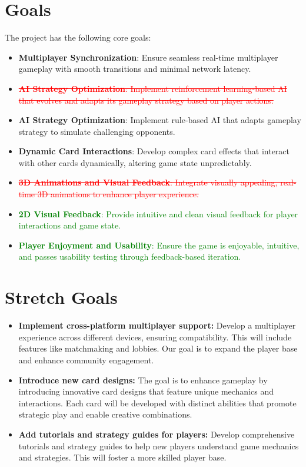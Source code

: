 \documentclass[12pt]{article}
\newcommand{\removed}[1]{\textcolor{red}{\sout{#1}}}
\newcommand{\added}[1]{\textcolor{green}{#1}}
\begin{document}
\section*{Goals}
The project has the following core goals:
\begin{itemize}
    \item \textbf{Multiplayer Synchronization}: Ensure seamless real-time multiplayer gameplay with smooth transitions and minimal network latency.
    \item{\removed { \textbf{AI Strategy Optimization}: Implement reinforcement learning-based AI that evolves and adapts its gameplay strategy based on player actions.}}
    \item \textbf{AI Strategy Optimization}: Implement rule-based AI that adapts gameplay strategy to simulate challenging opponents.
    \item \textbf{Dynamic Card Interactions}: Develop complex card effects that interact with other cards dynamically, altering game state unpredictably.
    \item{\removed { \textbf{3D Animations and Visual Feedback}: Integrate visually appealing, real-time 3D animations to enhance player experience.}}
    \item \added{\textbf{2D Visual Feedback}: Provide intuitive and clean visual feedback for player interactions and game state.}
    \item \added{\textbf{Player Enjoyment and Usability}: Ensure the game is enjoyable, intuitive, and passes usability testing through feedback-based iteration.}
\end{itemize}

\section*{Stretch Goals}
\begin{itemize}
    \item \textbf{Implement cross-platform multiplayer support:} Develop a multiplayer experience across different devices, ensuring compatibility. This will include features like matchmaking and lobbies. Our goal is to expand the player base and enhance community engagement.
    \item \textbf{Introduce new card designs:} The goal is to enhance gameplay by introducing innovative card designs that feature unique mechanics and interactions. Each card will be developed with distinct abilities that promote strategic play and enable creative combinations.
    \item \textbf{Add tutorials and strategy guides for players:} Develop comprehensive tutorials and strategy guides to help new players understand game mechanics and strategies. This will foster a more skilled player base.
\end{itemize}
\end{document}
